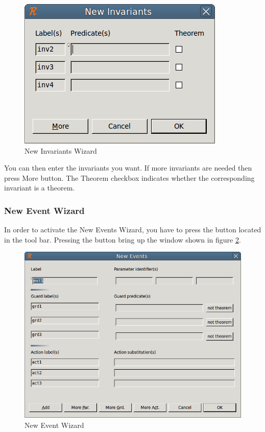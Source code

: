 \begin{figure}[!h]
\begin{center}
	\includegraphics{img/reference/ref_01_eventb_editor15.png}
	\caption{New Invariants Wizard}
	\label{fig_ref_01_eventb_editor15}
\end{center}
\end{figure}

You can then enter the invariants you want. If more invariants are needed then press \textsf{More} button. The \textsf{Theorem} checkbox indicates whether the corresponding invariant is a theorem.

\subsubsection{New Event Wizard}

In order to activate the \textsf{New Events Wizard}, you have to press the  button located in the tool bar. Pressing the button bring up the window shown in figure \ref{fig_ref_01_eventb_editor16}.

\begin{figure}[!h]
\begin{center}
	\includegraphics{img/reference/ref_01_eventb_editor16.png}
	\caption{New Event Wizard}
	\label{fig_ref_01_eventb_editor16}
\end{center}
\end{figure}

